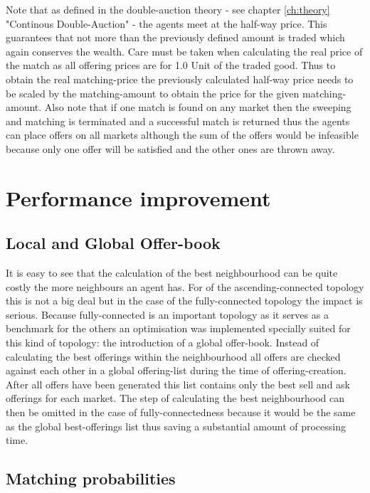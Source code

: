 \documentclass[Bachelorarbeit.tex]{subfiles}
\begin{document}
Note that as defined in the double-auction theory - see chapter \ref{ch:theory} "Continous Double-Auction" - the agents meet at the half-way price. This guarantees that not more than the previously defined amount is traded which again conserves the wealth. Care must be taken when calculating the real price of the match as all offering prices are for 1.0 Unit of the traded good. Thus to obtain the real matching-price the previously calculated half-way price needs to be scaled by the matching-amount to obtain the price for the given matching-amount.
\medskip
Also note that if one match is found on any market then the sweeping and matching is terminated and a successful match is returned thus the agents can place offers on all markets although the sum of the offers would be infeasible because only one offer will be satisfied and the other ones are thrown away.

\section{Performance improvement}
\label{sec:implementation_performanceImprovement}

\subsection{Local and Global Offer-book}
It is easy to see that the calculation of the best neighbourhood can be quite costly the more neighbours an agent has. For of the ascending-connected topology this is not a big deal but in the case of the fully-connected topology the impact is serious. Because fully-connected is an important topology as it serves as a benchmark for the others an optimisation was implemented specially suited for this kind of topology: the introduction of a global offer-book. Instead of calculating the best offerings within the neighbourhood all offers are checked against each other in a global offering-list during the time of offering-creation. After all offers have been generated this list contains only the best sell and ask offerings for each market. The step of calculating the best neighbourhood can then be omitted in the case of fully-connectedness because it would be the same as the global best-offerings list thus saving a substantial amount of processing time.

\subsection{Matching probabilities}
\end{document}
